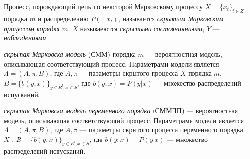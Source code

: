 \documentclass{matmex-diploma-custom}
\begin{document}
\begin{definition}
Процесс, порождающий цепь по некоторой Марковскому процессу $X = \{x_{t}\}_{t \in Z_{+}}$ порядка $m$ и распределению $P(.|~x_{t})$, называется \textit{скрытым Марковским процессом порядка $m$}. 
$ X $ называеются \textit{скрытыми состоянияниями}, $Y$ --- \textit{наблюдениями}.
\end{definition}

\begin{definition}
\textit{скрытая Марковска модель} (СММ) порядка $ m $ --- вероятностная модель, описывающая соответствующий процесс. Параметрами модели является $\Lambda=(A,\pi,B)$, где $A,\pi$ --- параметры скрытого процесса $X$ порядка $m$,  $ B = \{b(y,x)\}_{y \in R^{l}, x \in S}$, где $ b(y; x) = P(y|x)$ ---  множество распределений испусканий. 
\end{definition}

\begin{definition}
\textit{скрытая Марковска модель переменного порядка} (СММПП) --- вероятностная модель, описывающая соответствующий процесс. Параметрами модели является $\Lambda=(A,\pi,B)$, где $A,\pi$ --- параметры скрытого процесса переменного порядка $X$ ,  $ B = \{b(y,x)\}_{y \in R^{l}, x \in S}$, где $ b(y; x) = P(y|x)$ ---  множество распределений испусканий. 
\end{definition}
\end{document}

